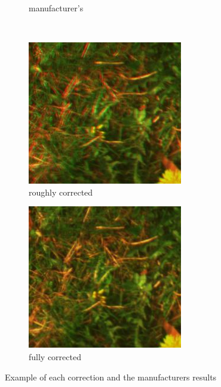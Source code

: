 \documentclass[]{elsarticle}
\begin{document}
\begin{figure}[ht]
\begin{subfigure}[b]{0.2\textwidth}
			\caption{manufacturer's}
			\label{fig:merged-correction-manufacturer}
		\end{subfigure}
		\\
		\begin{subfigure}[b]{0.2\textwidth}
			\centering
			\includegraphics[width=\linewidth]{../figures/results-affine}
			\caption{roughly corrected}
			\label{fig:merged-correction-affine}
		\end{subfigure}
		\begin{subfigure}[b]{0.2\textwidth}
			\centering
			\includegraphics[width=\linewidth]{../figures/results-perspective}
			\caption{fully corrected}
			\label{fig:merged-correction-perspective}
		\end{subfigure}
	
		\caption{Example of each correction and the manufacturers results}
		\label{fig:merged-correction}
	\end{figure}
	
\end{document}
